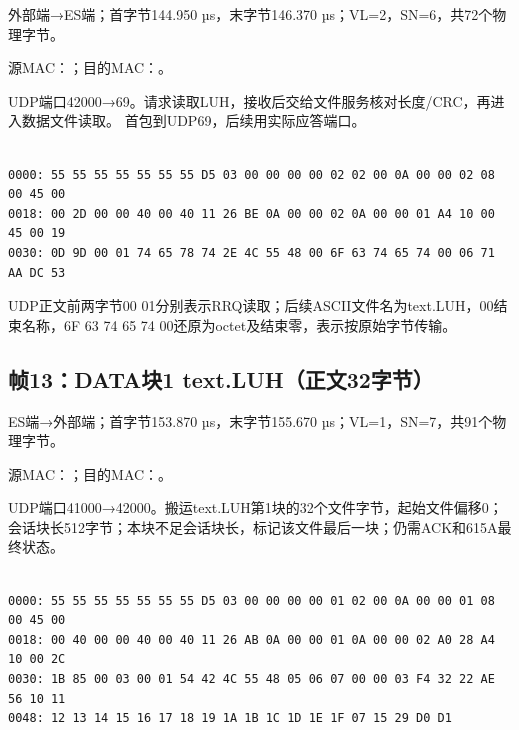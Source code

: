 外部端→ES端；首字节144.950 µs，末字节146.370 µs；VL=2，SN=6，共72个物理字节。

源MAC：；目的MAC：。

UDP端口42000→69。请求读取LUH，接收后交给文件服务核对长度/CRC，再进入数据文件读取。 首包到UDP69，后续用实际应答端口。

\par\noindent\begin{minipage}{\linewidth}
\begin{lstlisting}[caption={帧12物理字节，偏移0000--0047}]

0000: 55 55 55 55 55 55 55 D5 03 00 00 00 00 02 02 00 0A 00 00 02 08 00 45 00
0018: 00 2D 00 00 40 00 40 11 26 BE 0A 00 00 02 0A 00 00 01 A4 10 00 45 00 19
0030: 0D 9D 00 01 74 65 78 74 2E 4C 55 48 00 6F 63 74 65 74 00 06 71 AA DC 53

\end{lstlisting}
\end{minipage}\par

UDP正文前两字节00 01分别表示RRQ读取；后续ASCII文件名为text.LUH，00结束名称，6F 63 74 65 74 00还原为octet及结束零，表示按原始字节传输。

\subsection*{帧13：DATA块1 text.LUH（正文32字节）}

ES端→外部端；首字节153.870 µs，末字节155.670 µs；VL=1，SN=7，共91个物理字节。

源MAC：；目的MAC：。

UDP端口41000→42000。搬运text.LUH第1块的32个文件字节，起始文件偏移0；会话块长512字节；本块不足会话块长，标记该文件最后一块；仍需ACK和615A最终状态。

\par\noindent\begin{minipage}{\linewidth}
\begin{lstlisting}[caption={帧13物理字节，偏移0000--005A}]

0000: 55 55 55 55 55 55 55 D5 03 00 00 00 00 01 02 00 0A 00 00 01 08 00 45 00
0018: 00 40 00 00 40 00 40 11 26 AB 0A 00 00 01 0A 00 00 02 A0 28 A4 10 00 2C
0030: 1B 85 00 03 00 01 54 42 4C 55 48 05 06 07 00 00 03 F4 32 22 AE 56 10 11
0048: 12 13 14 15 16 17 18 19 1A 1B 1C 1D 1E 1F 07 15 29 D0 D1

\end{lstlisting}
\end{minipage}\par


